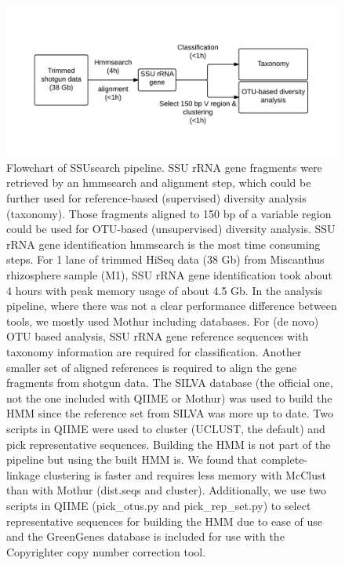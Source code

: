 \documentclass[]{msu-thesis}
\begin{document}
\begin{figure}[tbph!]
  \centering
  \includegraphics[scale=1]{figs/chap2_figS1}
  \caption[Flowchart of SSUsearch pipeline]{Flowchart of SSUsearch pipeline. SSU rRNA gene fragments were retrieved by an hmmsearch and alignment step, which could be further used for reference-based (supervised) diversity analysis (taxonomy). Those fragments aligned to 150 bp of a variable region could be used for OTU-based (unsupervised) diversity analysis. SSU rRNA gene identification hmmsearch is the most time consuming steps. For 1 lane of trimmed HiSeq data (38 Gb) from Miscanthus rhizosphere sample (M1), SSU rRNA gene identification took about 4 hours with peak memory usage of about 4.5 Gb. In the analysis pipeline, where there was not a clear performance difference between tools, we mostly used Mothur including databases. For (de novo) OTU based analysis, SSU rRNA gene reference sequences with taxonomy information are required for classification. Another smaller set of aligned references is required to align the gene fragments from shotgun data. The SILVA database (the official one, not the one included with QIIME or Mothur) was used to build the HMM since the reference set from SILVA was more up to date. Two scripts in QIIME were used to cluster (UCLUST, the default) and pick representative sequences. Building the HMM is not part of the pipeline but using the built HMM is. We found that complete-linkage clustering is faster and requires less memory with McClust than with Mothur (dist.seqs and cluster). Additionally, we use two scripts in QIIME (pick\_otus.py and pick\_rep\_set.py) to select representative sequences for building the HMM due to ease of use and the GreenGenes database is included for use with the Copyrighter copy number correction tool.}
  \label{fig:chap2FigS1}
\end{figure}
\end{document}
